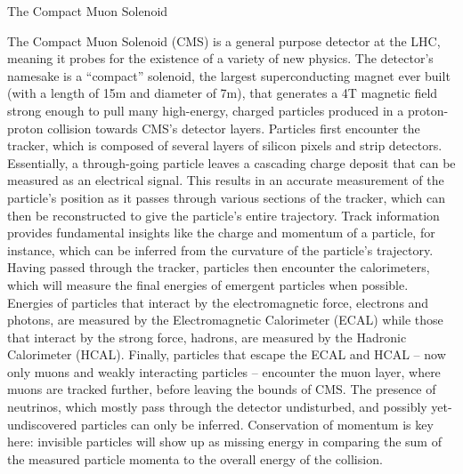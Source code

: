 \begin{section}{The Compact Muon Solenoid}

The Compact Muon Solenoid (CMS) is a general purpose detector at the LHC, meaning it probes for the existence of a variety of new physics. The detector's namesake is a ``compact'' solenoid, the largest superconducting magnet ever built (with a length of 15m and diameter of 7m), that generates a 4T magnetic field strong enough to pull many high-energy, charged particles produced in a proton-proton collision towards CMS's detector layers\cite{CMS:1994hea}. Particles first encounter the tracker, which is composed of several layers of silicon pixels and strip detectors. Essentially, a through-going particle leaves a cascading charge deposit that can be measured as an electrical signal. This results in an accurate measurement of the particle's position as it passes through various sections of the tracker, which can then be reconstructed to give the particle's entire trajectory. Track information provides fundamental insights like the charge and momentum of a particle, for instance, which can be inferred from the curvature of the particle's trajectory. Having passed through the tracker, particles then encounter the calorimeters, which will measure the final energies of emergent particles when possible. Energies of particles that interact by the electromagnetic force, electrons and photons, are measured by the Electromagnetic Calorimeter (ECAL) while those that interact by the strong force, hadrons, are measured by the Hadronic Calorimeter (HCAL). Finally, particles that escape the ECAL and HCAL -- now only muons and weakly interacting particles -- encounter the muon layer, where muons are tracked further, before leaving the bounds of CMS. The presence of neutrinos, which mostly pass through the detector undisturbed, and possibly yet-undiscovered particles can only be inferred. Conservation of momentum is key here: invisible particles will show up as missing energy in comparing the sum of the measured particle momenta to the overall energy of the collision.


\end{section}
